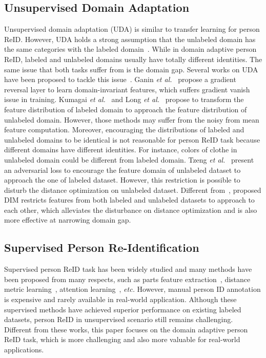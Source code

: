 \documentclass[sigconf]{acmart}
\begin{document}
\subsection{Unsupervised Domain Adaptation}
Unsupervised domain adaptation (UDA) is similar to transfer learning for person ReID. However, UDA holds a strong assumption that the unlabeled domain has the same categories with the labeled domain~\cite{wang2019transferable, yang2019cross}. While in domain adaptive person ReID, labeled and unlabeled domains usually have totally different identities. The same issue that both tasks suffer from is the domain gap. Several works on UDA have been proposed to tackle this issue~\cite{ganin2015unsupervised, kumagai2019unsupervised, long2015learning,  tzeng2017adversarial}. Ganin \textit{et al.}~\cite{ganin2015unsupervised} propose a gradient reversal layer to learn domain-invariant features, which suffers gradient vanish issue in training. Kumagai \textit{et al.}~\cite{kumagai2019unsupervised} and Long \textit{et al.}~\cite{long2015learning} propose to transform the feature distribution of labeled domain to approach the feature distribution of unlabeled domain. However, those methods may suffer from the noisy from mean feature computation. Moreover, encouraging the distributions of labeled and unlabeled domains to be identical is not reasonable for person ReID task because different domains have different identities. For instance, colors of clothe in unlabeled domain could be different from labeled domain.
Tzeng \textit{et al.}~\cite{tzeng2017adversarial} present an adversarial loss to encourage the feature domain of unlabeled dataset to approach the one of labeled dataset. However, this restriction is possible to disturb the distance optimization on unlabeled dataset. Different from~\cite{tzeng2017adversarial}, proposed DIM restricts features from both labeled and unlabeled datasets to approach to each other, which alleviates the disturbance on distance optimization and is also more effective at narrowing domain gap.

\subsection{Supervised Person Re-Identification}
Supervised person ReID task has been widely studied and many methods have been proposed from many respects, such as parts feature extraction~\cite{dlpar, spindle, longhui, jianing, li2019pose, liu2018ram}, distance metric learning~\cite{zhou2017point, quadruplet, ldns, defense, liu2019group}, attention learning~\cite{Chen_2019_ICCV_attention, teng2018scan}, \textit{etc.} However, manual person ID annotation is expensive and rarely available in real-world application. Although these supervised methods have achieved superior performance on existing labeled datasets, person ReID in unsupervised scenario still remains challenging. Different from these works, this paper focuses on the domain adaptive person ReID task, which is more challenging and also more valuable for real-world applications.
\end{document}
